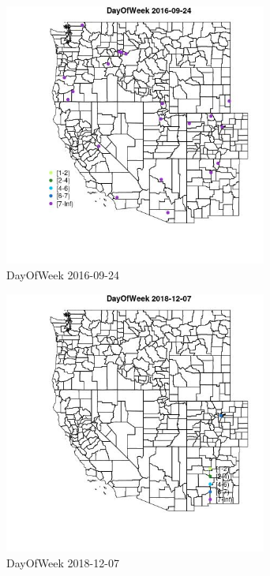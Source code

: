 \begin{figure} 
\centering  
\includegraphics[width=0.77\textwidth]{Code_Outputs/Report_ML_input_PM25_Step4_part_e_de_duplicated_aves_MapObsDayOfWeek2016-09-24.jpg} 
\caption{\label{fig:Report_ML_input_PM25_Step4_part_e_de_duplicated_avesMapObsDayOfWeek2016-09-24}DayOfWeek 2016-09-24} 
\end{figure} 
 

\begin{figure} 
\centering  
\includegraphics[width=0.77\textwidth]{Code_Outputs/Report_ML_input_PM25_Step4_part_e_de_duplicated_aves_MapObsDayOfWeek2018-12-07.jpg} 
\caption{\label{fig:Report_ML_input_PM25_Step4_part_e_de_duplicated_avesMapObsDayOfWeek2018-12-07}DayOfWeek 2018-12-07} 
\end{figure} 
 

